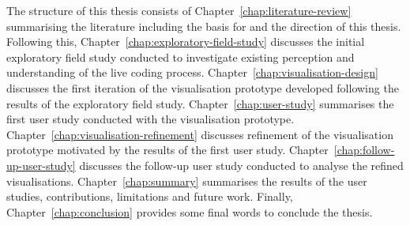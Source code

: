 The structure of this thesis consists of Chapter~\ref{chap:literature-review} summarising the literature including the basis for and the direction of this thesis. Following this, Chapter~\ref{chap:exploratory-field-study} discusses the initial exploratory field study conducted to investigate existing perception and understanding of the live coding process. Chapter~\ref{chap:visualisation-design} discusses the first iteration of the visualisation prototype developed following the results of the exploratory field study. Chapter~\ref{chap:user-study} summarises the first user study conducted with the visualisation prototype. Chapter~\ref{chap:visualisation-refinement} discusses refinement of the visualisation prototype motivated by the results of the first user study. Chapter~\ref{chap:follow-up-user-study} discusses the follow-up user study conducted to analyse the refined visualisations. Chapter~\ref{chap:summary} summarises the results of the user studies, contributions, limitations and future work. Finally, Chapter~\ref{chap:conclusion} provides some final words to conclude the thesis.

